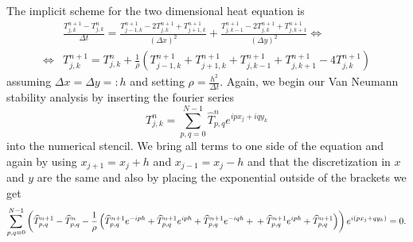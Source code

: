 \documentclass[a4aper,pagesize]{scrartcl}
\theoremstyle{definition}
\theoremstyle{plain}
\theoremstyle{remark}
\renewcommand{\hat}{\widehat}
\begin{document}
The implicit scheme for the two dimensional heat equation is
\begin{align}
	&\frac{T_{j,k}^{n+1} - T_{j,k}^{n}}{\Delta t}
	= \frac{T_{j-1,k}^{n+1} - 2 T_{j,k}^{n+1} + T_{j+1,k}^{n+1}}{(\Delta x)^2}
	+ \frac{T_{j,k-1}^{n+1} - 2 T_{j,k}^{n+1} + T_{j,k+1}^{n+1}}{(\Delta y)^2}
\Leftrightarrow\\
\Leftrightarrow
	&T_{j,k}^{n+1}
	= T_{j,k}^{n}
	+ \frac{1}{\rho} \left(
		T_{j-1,k}^{n+1}
		+ T_{j+1,k}^{n+1}
		+ T_{j,k-1}^{n+1}
		+ T_{j,k+1}^{n+1}
		- 4 T_{j,k}^{n+1}
	\right)
\end{align}
assuming $\Delta x = \Delta y =: h$ and setting $\rho = \frac{h^2}{\Delta t}$. Again, we begin our Van Neumann stability analysis by inserting the fourier series
\begin{equation}
	T_{j,k}^n = \sum_{p,q = 0}^{N-1} \hat{T}^n_{p,q} e^{ipx_j + iqy_k}
\end{equation}
into the numerical stencil. We bring all terms to one side of the equation and again by using $x_{j+1} = {x_j} + h$ and $x_{j-1} = {x_j} - h$ and that the discretization in $x$ and $y$ are the same and also by placing the exponential outside of the brackets we get
\begin{dmath}
	\sum_{p,q = 0}^{N-1} \left(
		\hat{T}_{p,q}^{n+1}
		-\hat{T}_{p,q}^{n}
		-\frac{1}{\rho}\left(
			\hat{T}_{p,q}^{n+1} e^{-iph}
			+ \hat{T}_{p,q}^{n+1} e^{iph}
			+ \hat{T}_{p,q}^{n+1} e^{-iqh}+\\
			+ \hat{T}_{p,q}^{n+1} e^{iph}
			+ \hat{T}_{p,q}^{n+1}
		\right)
	\right)
	e^{i(px_j + qy_k)}
	=
	0.
\end{dmath}
\end{document}
